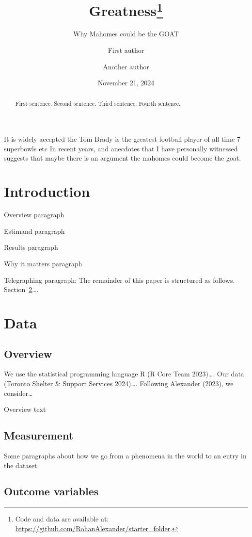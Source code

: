 \documentclass[
  letterpaper,
  DIV=11,
  numbers=noendperiod]{scrartcl}
\title{Greatness\thanks{Code and data are available at:
\url{https://github.com/RohanAlexander/starter_folder}.}}
\subtitle{Why Mahomes could be the GOAT}
\author{First author \and Another author}
\date{November 21, 2024}
\begin{document}
\maketitle
\begin{abstract}
First sentence. Second sentence. Third sentence. Fourth sentence.
\end{abstract}


It is widely accepted the Tom Brady is the greatest football player of
all time 7 superbowls etc In recent years, and anecdotes that I have
personally witnessed suggests that maybe there is an argument the
mahomes could become the goat.

\section{Introduction}\label{introduction}

Overview paragraph

Estimand paragraph

Results paragraph

Why it matters paragraph

Telegraphing paragraph: The remainder of this paper is structured as
follows. Section~\ref{sec-data}\ldots.

\section{Data}\label{sec-data}

\subsection{Overview}\label{overview}

We use the statistical programming language R (R Core Team 2023)\ldots.
Our data (Toronto Shelter \& Support Services 2024)\ldots. Following
Alexander (2023), we consider\ldots{}

Overview text

\subsection{Measurement}\label{measurement}

Some paragraphs about how we go from a phenomena in the world to an
entry in the dataset.

\subsection{Outcome variables}\label{outcome-variables}
\end{document}
